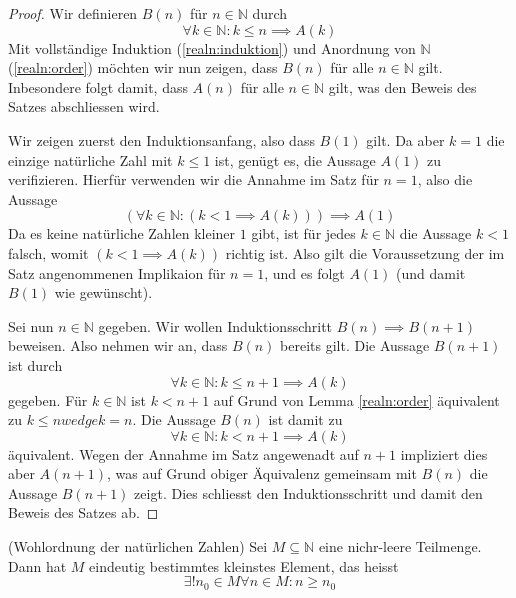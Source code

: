 \documentclass[../Analysis1_script.tex]{subfiles}
\begin{document}
\begin{proof}
	Wir definieren $B(n)$ für $n \in \mathbb{N}$ durch 
	\begin{equation}
		\forall k \in \mathbb{N} : k \leq n  \implies A(k)
	\end{equation}
	Mit vollständige Induktion (\ref{realn:induktion}) und Anordnung von $\mathbb{N}$ (\ref{realn:order}) möchten wir nun zeigen, dass $B(n)$ für alle $n \in \mathbb{N}$ gilt. Inbesondere folgt damit, dass $A(n)$ für alle $n \in \mathbb{N}$ gilt, was den Beweis des Satzes abschliessen wird.
	
	Wir zeigen zuerst den Induktionsanfang, also dass $B(1)$ gilt. Da aber $k = 1$ die einzige natürliche Zahl mit $k \leq 1$ ist, genügt es, die Aussage $A(1)$ zu verifizieren. Hierfür verwenden wir die Annahme im Satz für $n = 1$, also die Aussage
	\begin{equation}
		(\forall k \in \mathbb{N} : (k < 1 \implies A(k))) \implies A(1)
	\end{equation}
	Da es keine natürliche Zahlen kleiner $1$ gibt, ist für jedes $k \in \mathbb{N}$ die Aussage $k < 1$ falsch, womit $(k < 1 \implies A(k))$ richtig ist. Also gilt die Voraussetzung der im Satz angenommenen Implikaion für $n = 1$, und es folgt $A(1)$ (und damit $B(1)$ wie gewünscht).
	
	Sei nun $n \in \mathbb{N}$ gegeben. Wir wollen Induktionsschritt $B(n) \implies B(n+1)$ beweisen. Also nehmen wir an, dass $B(n)$ bereits gilt. Die Aussage $B(n+1)$ ist durch
	\begin{equation}
		\forall k \in \mathbb{N}: k \leq n+1 \implies A(k)
	\end{equation}
	gegeben. Für $k \in \mathbb{N}$ ist $k < n + 1$ auf Grund von Lemma \ref{realn:order} äquivalent zu $k \leq n wedge k = n$. Die Aussage $B(n)$ ist damit zu 
	\begin{equation}
		\forall k \in \mathbb{N}: k < n + 1 \implies A(k)
	\end{equation}
	äquivalent. Wegen der Annahme im Satz angewenadt auf $n + 1$ impliziert dies aber $A(n+1)$, was auf Grund obiger Äquivalenz gemeinsam mit $B(n)$ die Aussage $B(n+1)$ zeigt. Dies schliesst den Induktionsschritt und damit den Beweis des Satzes ab.
\end{proof}  

\begin{proposition}{(Wohlordnung der natürlichen Zahlen)}\label{realn:full-order_N}
	Sei $M \subseteq \mathbb{N}$ eine nichr-leere Teilmenge. Dann hat $M$ eindeutig bestimmtes kleinstes Element, das heisst
	\begin{equation}
		\exists !n_0 \in M \forall n \in M : n \geq n_0
	\end{equation}
\end{proposition}
\end{document}
